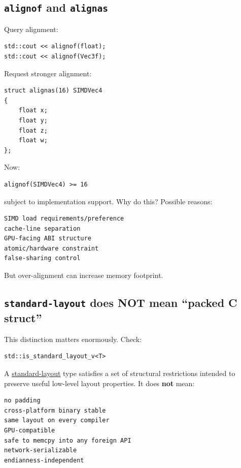 \subsection{\texorpdfstring{\texttt{alignof} and \texttt{alignas}}{alignof and alignas}}\label{01-foundations-i-ch003-alignof-and-alignas}

Query alignment:

\begin{verbatim}
std::cout << alignof(float);
std::cout << alignof(Vec3f);
\end{verbatim}

Request stronger alignment:

\begin{verbatim}
struct alignas(16) SIMDVec4
{
    float x;
    float y;
    float z;
    float w;
};
\end{verbatim}

Now:

\begin{verbatim}
alignof(SIMDVec4) >= 16
\end{verbatim}

subject to implementation support. Why do this? Possible reasons:

\begin{verbatim}
SIMD load requirements/preference
cache-line separation
GPU-facing ABI structure
atomic/hardware constraint
false-sharing control
\end{verbatim}

But over-alignment can increase memory footprint.

\subsection{\texorpdfstring{\texttt{standard-layout} does NOT mean ``packed C struct''}{standard-layout does NOT mean ``packed C struct''}}\label{01-foundations-i-ch003-standard-layout-does-not-mean-packed-c-struct}

This distinction matters enormously. Check:

\begin{verbatim}
std::is_standard_layout_v<T>
\end{verbatim}

A \hyperref[appendix-958870a64c53]{standard-layout} type satisfies a set of structural restrictions intended to preserve useful low-level layout properties. It does \textbf{not} mean:

\begin{verbatim}
no padding
cross-platform binary stable
same layout on every compiler
GPU-compatible
safe to memcpy into any foreign API
network-serializable
endianness-independent
\end{verbatim}


